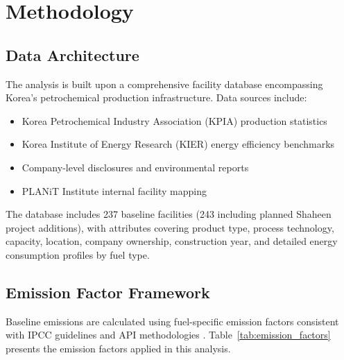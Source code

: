 \documentclass[12pt,a4paper]{article}
\begin{document}
\section{Methodology}

\subsection{Data Architecture}

The analysis is built upon a comprehensive facility database encompassing Korea's petrochemical production infrastructure. Data sources include:

\begin{itemize}
\item Korea Petrochemical Industry Association (KPIA) production statistics \citep{kpia2024}
\item Korea Institute of Energy Research (KIER) energy efficiency benchmarks \citep{kier2022}
\item Company-level disclosures and environmental reports
\item PLANiT Institute internal facility mapping \citep{planit2025}
\end{itemize}

The database includes 237 baseline facilities (243 including planned Shaheen project additions), with attributes covering product type, process technology, capacity, location, company ownership, construction year, and detailed energy consumption profiles by fuel type.

\subsection{Emission Factor Framework}

Baseline emissions are calculated using fuel-specific emission factors consistent with IPCC guidelines \citep{ipcc2019} and API methodologies \citep{api2021}. Table~\ref{tab:emission_factors} presents the emission factors applied in this analysis.
\end{document}

